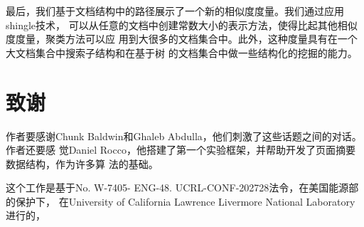 最后，我们基于文档结构中的路径展示了一个新的相似度度量。我们通过应用shingle技术，
可以从任意的文档中创建常数大小的表示方法，使得比起其他相似度度量，聚类方法可以应
用到大很多的文档集合中。此外，这种度量具有在一个大文档集合中搜索子结构和在基于树
的文档集合中做一些结构化的挖掘的能力。

\section*{致谢}
作者要感谢Chunk Baldwin和Ghaleb Abdulla，他们刺激了这些话题之间的对话。作者还要感
觉Daniel Rocco，他搭建了第一个实验框架，并帮助开发了页面摘要数据结构，作为许多算
法的基础。

这个工作是基于No. W-7405- ENG-48. UCRL-CONF-202728法令，在美国能源部的保护下，
在University of California Lawrence Livermore National Laboratory进行的，

